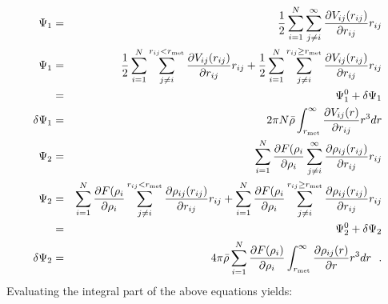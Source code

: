 \begin{eqnarray}
\Psi_{1} &=& {1 \over 2} \sum_{i=1}^{N} \sum_{j \ne i}^{\infty}
\frac{\partial V_{ij}(r_{ij})}{\partial r_{ij}} r_{ij} \nonumber \\
\Psi_{1} &=& {1 \over 2} \sum_{i=1}^{N} \sum_{j \ne i}^{r_{ij}<r_{\rm met}}
\frac{\partial V_{ij}(r_{ij})}{\partial r_{ij}} r_{ij} +
{1 \over 2} \sum_{i=1}^{N} \sum_{j \ne i}^{r_{ij} \ge r_{\rm met}}
\frac{\partial V_{ij}(r_{ij})}{\partial r_{ij}} r_{ij} \nonumber \\
&=& \Psi_{1}^{0} + \delta \Psi_{1} \nonumber \\
\delta \Psi_{1} &=& 2 \pi N \bar{\rho} \int_{r_{\rm met}}^{\infty}
\frac{\partial V_{ij}(r)}{\partial r_{ij}} r^{3} dr \nonumber \\
\Psi_{2} &=& \sum_{i=1}^{N} \frac{\partial F(\rho_{i}}{\partial \rho_{i}}
\sum_{j \ne i}^{\infty} \frac{\partial \rho_{ij}(r_{ij})}{\partial r_{ij}} r_{ij} \\
\Psi_{2} &=& \sum_{i=1}^{N} \frac{\partial F(\rho_{i}}{\partial \rho_{i}}
\sum_{j \ne i}^{r_{ij}<r_{\rm met}} \frac{\partial \rho_{ij}(r_{ij})}{\partial r_{ij}} r_{ij} +
\sum_{i=1}^{N} \frac{\partial F(\rho_{i}}{\partial \rho_{i}}
\sum_{j \ne i}^{r_{ij} \ge r_{\rm met}} \frac{\partial \rho_{ij}(r_{ij})}{\partial r_{ij}} r_{ij} \nonumber \\
&=& \Psi_{2}^{0} + \delta \Psi_{2} \nonumber \\
\delta \Psi_{2} &=& 4 \pi \bar{\rho} \sum_{i=1}^{N} \frac{\partial F(\rho_{i})}{\partial \rho_{i}}
\int_{r_{\rm met}}^{\infty} \frac{\partial \rho_{ij}(r)}{\partial r} r^{3} dr~~. \nonumber
\end{eqnarray}
Evaluating the integral part of the above equations yields:
